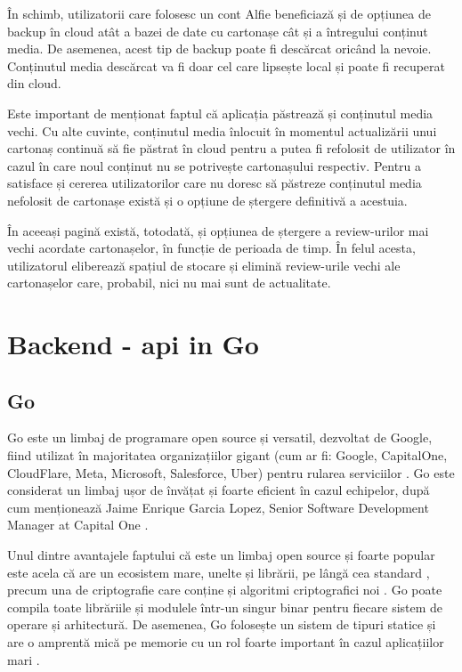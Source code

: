 În schimb, utilizatorii care folosesc un cont Alfie beneficiază și de opțiunea de backup în cloud atât a bazei de date cu cartonașe cât și a întregului conținut media. De asemenea, acest tip de backup poate fi descărcat oricând la nevoie. Conținutul media descărcat va fi doar cel care lipsește local și poate fi recuperat din cloud.

Este important de menționat faptul că aplicația păstrează și conținutul media vechi. Cu alte cuvinte, conținutul media înlocuit în momentul actualizării unui cartonaș continuă să fie păstrat în cloud pentru a putea fi refolosit de utilizator în cazul în care noul conținut nu se potrivește cartonașului respectiv. Pentru a satisface și cererea utilizatorilor care nu doresc să păstreze conținutul media nefolosit de cartonașe există și o opțiune de ștergere definitivă a acestuia.

În aceeași pagină există, totodată, și opțiunea de ștergere a review-urilor mai vechi acordate cartonașelor, în funcție de perioada de timp. În felul acesta, utilizatorul eliberează spațiul de stocare și elimină review-urile vechi ale cartonașelor care, probabil, nici nu mai sunt de actualitate.

\section{Backend - api in Go}

\subsection{Go}

Go este un limbaj de programare open source și versatil, dezvoltat de Google, fiind utilizat în majoritatea organizațiilor gigant (cum ar fi: Google, CapitalOne, CloudFlare, Meta, Microsoft, Salesforce, Uber) pentru rularea serviciilor \cite{goDev}. Go este considerat un limbaj ușor de învățat și foarte eficient în cazul echipelor, după cum menționează Jaime Enrique Garcia Lopez, Senior Software Development Manager at Capital One \cite{goDev}.

Unul dintre avantajele faptului că este un limbaj open source și foarte popular este acela că are un ecosistem mare, unelte și librării, pe lângă cea standard \cite{goSTDLibrary}, precum una de criptografie care conține și algoritmi criptografici noi \cite{goCryptoModule}. Go poate compila toate librăriile și modulele într-un singur binar pentru fiecare sistem de operare și arhitectură. De asemenea, Go folosește un sistem de tipuri statice și are o amprentă mică pe memorie cu un rol foarte important în cazul aplicațiilor mari \cite{goDevMatt}.

